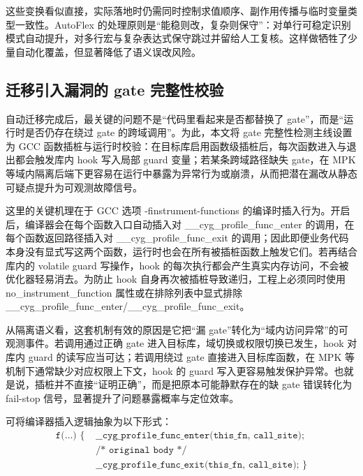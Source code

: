 \documentclass[UTF8,a4paper,12pt,twoside]{ctexart}  %
\begin{document}
这些变换看似直接，实际落地时仍需同时控制求值顺序、副作用传播与临时变量类型一致性。AutoFlex
的处理原则是``能稳则改，复杂则保守''：对单行可稳定识别模式自动提升，对多行宏与复杂表达式保守跳过并留给人工复核。这样做牺牲了少量自动化覆盖，但显著降低了语义误改风险。

\subsection{迁移引入漏洞的 gate 完整性校验}

自动迁移完成后，最关键的问题不是``代码里看起来是否都替换了
gate''，而是``运行时是否仍存在绕过 gate 的跨域调用''。为此，本文将 gate
完整性检测主线设置为 GCC
函数插桩与运行时校验：在目标库启用函数级插桩后，每次函数进入与退出都会触发库内
hook 写入局部 guard 变量；若某条跨域路径缺失 gate，在 MPK
等域内隔离后端下更容易在运行中暴露为异常行为或崩溃，从而把潜在漏改从静态可疑点提升为可观测故障信号。

这里的关键机理在于 GCC 选项 -finstrument-functions
的编译时插入行为。开启后，编译器会在每个函数入口自动插入对
\_\_cyg\_profile\_func\_enter 的调用，在每个函数返回路径插入对
\_\_cyg\_profile\_func\_exit
的调用；因此即便业务代码本身没有显式写这两个函数，运行时也会在所有被插桩函数上触发它们。若再结合库内的
volatile guard 写操作，hook
的每次执行都会产生真实内存访问，不会被优化器轻易消去。为防止 hook
自身再次被插桩导致递归，工程上必须同时使用 no\_instrument\_function
属性或在排除列表中显式排除
\_\_cyg\_profile\_func\_enter/\_\_cyg\_profile\_func\_exit。

从隔离语义看，这套机制有效的原因是它把``漏
gate''转化为``域内访问异常''的可观测事件。若调用通过正确 gate
进入目标库，域切换或权限切换已发生，hook 对库内 guard
的读写应当可达；若调用绕过 gate 直接进入目标库函数，在 MPK
等机制下通常缺少对应权限上下文，hook 的 guard
写入更容易触发保护异常。也就是说，插桩并不直接``证明正确''，而是把原本可能静默存在的缺
gate 错误转化为 fail-stop 信号，显著提升了问题暴露概率与定位效率。

可将编译器插入逻辑抽象为以下形式：
\begin{equation}
\begin{aligned}
\texttt{f(\ldots)\ \{\ } & \texttt{\_\_cyg\_profile\_func\_enter(this\_fn, call\_site);}\ \\
& \texttt{/* original body */}\ \\
& \texttt{\_\_cyg\_profile\_func\_exit(this\_fn, call\_site);\ \}}
\end{aligned}
\end{equation}
\end{document}
